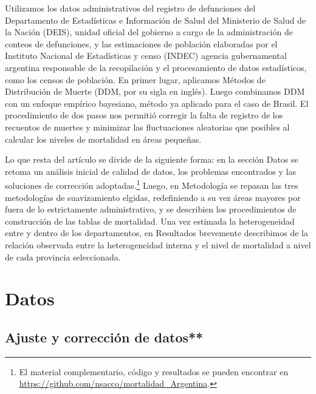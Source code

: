 \documentclass[12pt,]{article}
\begin{document}
Utilizamos los datos administrativos del registro de defunciones del
Departamento de Estadísticas e Información de Salud del Ministerio de
Salud de la Nación (DEIS), unidad oficial del gobierno a cargo de la
administración de conteos de defunciones, y las estimaciones de
población elaboradas por el Instituto Nacional de Estadísticas y censo
(INDEC) agencia gubernamental argentina responsable de la recopilación y
el procesamiento de datos estadísticos, como los censos de población. En
primer lugar, aplicamos Métodos de Distribución de Muerte (DDM, por su
sigla en inglés). Luego combinamos DDM con un enfoque empírico
bayesiano, método ya aplicado para el caso de Brasil. El procedimiento
de dos pasos nos permitió corregir la falta de registro de los recuentos
de muertes y minimizar las fluctuaciones aleatorias que posibles al
calcular los niveles de mortalidad en áreas pequeñas.

Lo que resta del artículo se divide de la siguiente forma: en la sección
Datos se retoma un análisis inicial de calidad de datos, los problemas
encontrados y las soluciones de corrección adoptadas.\footnote{El
  material complementario, código y resultados se pueden encontrar en
  \url{https://github.com/nsacco/mortalidad_Argentina}.} Luego, en
Metodología se repasan las tres metodologías de suavizamiento elgidas,
redefiniendo a su vez áreas mayores por fuera de lo estrictamente
administrativo, y se describien los procedimientos de construcción de
las tablas de mortalidad. Una vez estimada la heterogeneidad entre y
dentro de los departamentos, en Resultados brevemente describimos de la
relación observada entre la heterogeneidad interna y el nivel de
mortalidad a nivel de cada provincia seleccionada.

\hypertarget{datos}{%
\section{\texorpdfstring{\textbf{Datos}}{Datos}}\label{datos}}

\hypertarget{ajuste-y-correcciuxf3n-de-datos}{%
\subsection{Ajuste y corrección de
datos**}\label{ajuste-y-correcciuxf3n-de-datos}}
\end{document}
